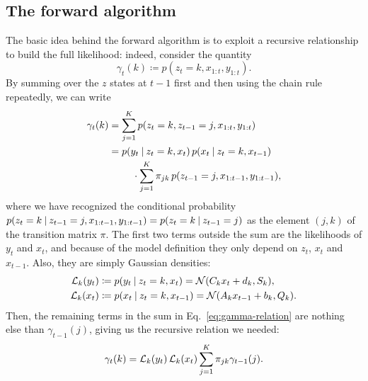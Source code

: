 \documentclass[
  10pt, twocolumn, headings=normal,
  footlines=1, DIV=calc
]{scrartcl}
\begin{document}
\subsection{The forward algorithm}\label{sec:forward-algorithm}
The basic idea behind the forward algorithm is to exploit a recursive
relationship to build the full likelihood: indeed, consider the quantity
\begin{equation}
  \gamma_{t}(k) \coloneq p(z_{t} = k, x_{1:t}, y_{1:t}).
\end{equation}
By summing over the $z$ states at $t-1$ first and then using the chain rule
repeatedly, we can write
\begin{equation}
  \begin{split}
    \gamma_{t}(k) &= \sum_{j=1}^{K}
      p(z_{t} = k, z_{t-1} = j, x_{1:t}, y_{1:t}) \\
      &= \!\begin{multlined}[t]
        p(y_{t} \given z_{t} = k, x_{t}) \,
        p(x_{t} \given z_{t} = k, x_{t-1}) \\
        \cdot \sum_{j=1}^{K} \pi_{jk}\,
          p(z_{t-1} = j, x_{1:t-1}, y_{1:t-1}),
      \end{multlined}
  \end{split}
  \label{eq:gamma-relation}
\end{equation}
where we have recognized the conditional probability $p(z_{t} = k \:\vert\: z_{t-1}
= j, x_{1:t-1}, y_{1:t-1}) = p(z_{t} = k \:\vert\: z_{t-1} = j)$ as the element
$(j, k)$ of the transition matrix $\pi$. The first two terms outside the sum are
the likelihoods of $y_{t}$ and $x_{t}$, and because of the model definition they
only depend on $z_{t}$, $x_{t}$ and $x_{t-1}$. Also, they are simply Gaussian
densities:
\begin{align}
  \mathcal{L}_{k}(y_{t}) &\coloneq p(y_{t} \:\vert\: z_{t} = k, x_{t})
    = \mathcal{N}(C_{k} x_{t} + d_{k}, S_{k}), \\
  \mathcal{L}_{k}(x_{t}) &\coloneq p(x_{t} \:\vert\: z_{t} = k, x_{t-1})
    = \mathcal{N}(A_{k} x_{t-1} + b_{k}, Q_{k}).
\end{align}
Then, the remaining terms in the sum in Eq.~\eqref{eq:gamma-relation} are
nothing else than $\gamma_{t-1}(j)$, giving us the recursive relation we needed:
\begin{equation}
  \gamma_{t}(k) = \mathcal{L}_{k}(y_{t})\, \mathcal{L}_{k}(x_{t})
    \sum_{j=1}^{K} \pi_{jk} \gamma_{t-1}(j).
\end{equation}
\end{document}
